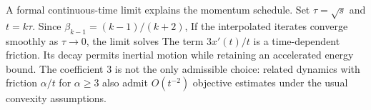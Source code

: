 A formal continuous-time limit explains the momentum schedule. Set $\tau=\sqrt s$ and $t=k\tau$. Since $\beta_{k-1}=(k-1)/(k+2)$,
If the interpolated iterates converge smoothly as $\tau\to0$, the limit solves
The term $3x'(t)/t$ is a time-dependent friction. Its decay permits inertial motion while retaining an accelerated energy bound. The coefficient $3$ is not the only admissible choice: related dynamics with friction $\alpha/t$ for $\alpha\geq3$ also admit $O(t^{-2})$ objective estimates under the usual convexity assumptions.
